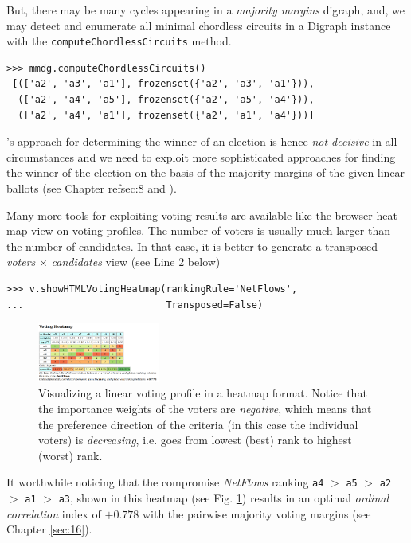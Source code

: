 But, there may be many cycles appearing in a \emph{majority margins} digraph, and, we may detect and enumerate all minimal chordless circuits in a Digraph instance with the \texttt{computeChordlessCircuits} method.
\begin{lstlisting}
>>> mmdg.computeChordlessCircuits()
 [(['a2', 'a3', 'a1'], frozenset({'a2', 'a3', 'a1'})), 
  (['a2', 'a4', 'a5'], frozenset({'a2', 'a5', 'a4'})), 
  (['a2', 'a4', 'a1'], frozenset({'a2', 'a1', 'a4'}))]
\end{lstlisting}

\Condorcet 's approach for determining the winner of an election is hence \emph{not decisive} in all circumstances and we need to exploit more sophisticated approaches for finding the winner of the election on the basis of the majority margins of the given linear ballots (see Chapter ref{sec:8} and \citet{BIS-2008a}). 

Many more tools for exploiting voting results are available like the browser heat map view on voting profiles. The number of voters is usually much larger than the number of candidates. In that case, it is better to generate a transposed \emph{voters} $\times$ \emph{candidates} view (see Line 2 below) 
\begin{lstlisting}
>>> v.showHTMLVotingHeatmap(rankingRule='NetFlows',
...                         Transposed=False)
\end{lstlisting}
\begin{figure}[h]
\sidecaption[t]
\includegraphics[width=4cm]{Figures/votingHeatmap.png}
\caption{Visualizing a linear voting profile in a heatmap format. Notice that the importance weights of the voters are \emph{negative}, which means that the preference direction of the criteria (in this case the individual voters) is \emph{decreasing}, i.e. goes from lowest (best) rank to highest (worst) rank.
}
\label{fig:7.3}       %
\end{figure}

It worthwhile noticing that the compromise \emph{NetFlows} ranking \texttt{a4} $>$ \texttt{a5} $>$ \texttt{a2} $>$ \texttt{a1} $>$ \texttt{a3}, shown in this heatmap (see Fig. \ref{fig:7.3}) results in an optimal \emph{ordinal correlation} index of $+0.778$ with the pairwise majority voting margins (see Chapter \ref{sec:16}). 

